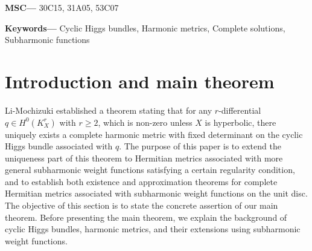\documentclass[12pt]{article}
\theoremstyle{definition}
\providecommand{\keywords}[1]
{
\small 
\textbf{{Keywords---}} #1
}
\providecommand{\MSC}[1]
{
\small 
\textbf{{MSC---}} #1
}
\begin{document}
\MSC{30C15, 31A05, 53C07}

\keywords{Cyclic Higgs bundles, Harmonic metrics, Complete solutions, Subharmonic functions}

\section{Introduction and main theorem}\label{1}
Li-Mochizuki \cite{LM1} established a theorem stating that for any $r$-differential $q \in H^0(K_X^r)$ with $r\geq 2$, which is non-zero unless $X$ is hyperbolic, there uniquely exists a complete harmonic metric with fixed determinant on the cyclic Higgs bundle associated with $q$.
The purpose of this paper is to extend the uniqueness part of this theorem to Hermitian metrics associated with more general subharmonic weight functions satisfying a certain regularity condition, and to establish both existence and approximation theorems for complete Hermitian metrics associated with subharmonic weight functions on the unit disc. The objective of this section is to state the concrete assertion of our main theorem. Before presenting the main theorem, we explain the background of cyclic Higgs bundles, harmonic metrics, and their extensions using subharmonic weight functions.
\end{document}
